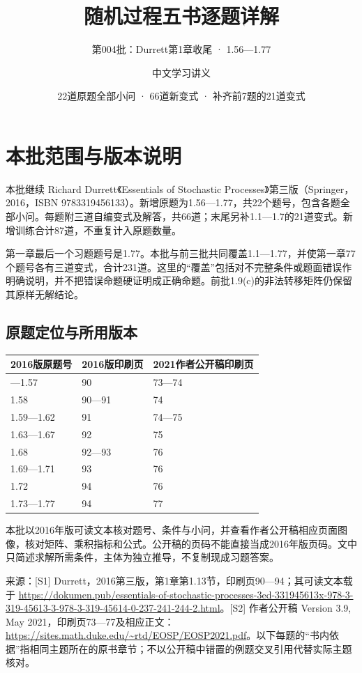 \documentclass[
  11pt,a4paper,UTF8,fontset=fandol]{ctexart}
\title{随机过程五书逐题详解}
\subtitle{第004批：Durrett第1章收尾 · 1.56---1.77}
\author{中文学习讲义}
\date{22道原题全部小问 · 66道新变式 · 补齐前7题的21道变式}
\begin{document}
\maketitle

{
\setcounter{tocdepth}{1}
\tableofcontents
}
\section{本批范围与版本说明}\label{ux672cux6279ux8303ux56f4ux4e0eux7248ux672cux8bf4ux660e}

本批继续 Richard Durrett《Essentials of Stochastic
Processes》第三版（Springer，2016，ISBN
9783319456133）。新增原题为1.56---1.77，共22个题号，包含各题全部小问。每题附三道自编变式及解答，共66道；末尾另补1.1---1.7的21道变式。新增训练合计87道，不重复计入原题数量。

第一章最后一个习题题号是1.77。本批与前三批共同覆盖1.1---1.77，并使第一章77个题号各有三道变式，合计231道。这里的``覆盖''包括对不完整条件或题面错误作明确说明，并不把错误命题硬证明成正确命题。前批1.9(c)的非法转移矩阵仍保留其原样无解结论。

\subsection{原题定位与所用版本}\label{ux539fux9898ux5b9aux4f4dux4e0eux6240ux7528ux7248ux672c}

\begin{longtable}[]{@{}lll@{}}
\toprule\noalign{}
2016版原题号 & 2016版印刷页 & 2021作者公开稿印刷页 \\
\midrule\noalign{}
\endhead
\bottomrule\noalign{}
\endlastfoot
1.56---1.57 & 90 & 73---74 \\
1.58 & 90---91 & 74 \\
1.59---1.62 & 91 & 74---75 \\
1.63---1.67 & 92 & 75 \\
1.68 & 92---93 & 76 \\
1.69---1.71 & 93 & 76 \\
1.72 & 94 & 76 \\
1.73---1.77 & 94 & 77 \\
\end{longtable}

本批以2016年版可读文本核对题号、条件与小问，并查看作者公开稿相应页面图像，核对矩阵、乘积指标和公式。公开稿的页码不能直接当成2016年版页码。文中只简述求解所需条件，主体为独立推导，不复制现成习题答案。

来源：{[}S1{]}
Durrett，2016第三版，第1章第1.13节，印刷页90---94；其可读文本载于
\url{https://dokumen.pub/essentials-of-stochastic-processes-3ed-331945613x-978-3-319-45613-3-978-3-319-45614-0-237-241-244-2.html}。{[}S2{]}
作者公开稿 Version 3.9, May
2021，印刷页73---77及相应正文：\url{https://sites.math.duke.edu/~rtd/EOSP/EOSP2021.pdf}。以下每题的``书内依据''指相同主题所在的原书章节；不以公开稿中错置的例题交叉引用代替实际主题核对。
\end{document}
